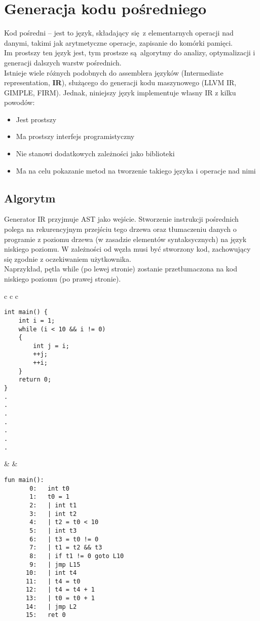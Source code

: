 \section{Generacja kodu pośredniego}
	
	Kod pośredni -- jest to język, składający się z elementarnych operacji nad danymi, takimi jak
	arytmetyczne operacje, zapisanie do komórki pamięci.
	\\
	
	Im prostszy ten język jest, tym prostsze
	są algorytmy do analizy, optymalizacji i generacji dalszych warstw pośrednich.
	\\
	
	Istnieje wiele różnych podobnych do assemblera języków (Intermediate representation, \textbf{IR}), służącego
	do generacji kodu maszynowego (LLVM IR, GIMPLE, FIRM). Jednak, niniejszy język implementuje własny IR z
	kilku powodów:
	
	\begin{itemize}
		\item Jest prostszy
		\item Ma prostszy interfejs programistyczny
		\item Nie stanowi dodatkowych zależności jako biblioteki
		\item Ma na celu pokazanie metod na tworzenie takiego języka i operacje nad nimi
	\end{itemize}
	
	\subsection{Algorytm}
		Generator IR przyjmuje AST jako wejście. Stworzenie instrukcji pośrednich
		polega na rekurencyjnym przejściu tego drzewa oraz tłumaczeniu danych o
		programie z poziomu drzewa (w zasadzie elementów syntaksycznych) na język
		niskiego poziomu. W zależności od węzła musi być stworzony kod, zachowujący
		się zgodnie z oczekiwaniem użytkownika.
		\\
		
		Naprzykład, pętla while (po lewej stronie) zostanie przetłumaczona na
		kod niskiego poziomu (po prawej stronie).

		\begin{center}
		\begin{tabular}{ c c c }
\begin{lstlisting}[label={lst:warn-unused-var},linewidth=6.5cm]
int main() {
    int i = 1;
    while (i < 10 && i != 0)
    {
        int j = i;
        ++j;
        ++i;
    }
    return 0;
}			
.
.
.
.
.
.
.
\end{lstlisting}
		& &	
\begin{lstlisting}[label={lst:warn-unused-var},linewidth=8cm]
fun main():
       0:   int t0
       1:   t0 = 1
       2:   | int t1
       3:   | int t2
       4:   | t2 = t0 < 10
       5:   | int t3
       6:   | t3 = t0 != 0
       7:   | t1 = t2 && t3
       8:   | if t1 != 0 goto L10
       9:   | jmp L15
      10:   | int t4
      11:   | t4 = t0
      12:   | t4 = t4 + 1
      13:   | t0 = t0 + 1
      14:   | jmp L2
      15:   ret 0
\end{lstlisting}
		\end{tabular}
		\end{center}
		
